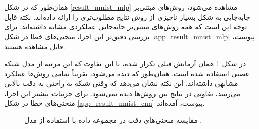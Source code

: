 همان‌طور که در شکل
\ref{result_mnist_mlp} 
مشاهده می‌شود، روش‌های مبتنی‌بر جابه‌جایی به شکل بسیار ناچیزی از روش
نتایج مطلوب‌تری را ارائه داده‌اند. نکته قابل توجه این است که همه روش‌های مبتنی‌بر جابه‌جایی عملکردی مشابه داشته‌اند. برای بررسی دقیق‌تر این اجرا، منحنی‌های خطا در شکل
\ref{app_result_mnist_mlp}
پیوست، قابل مشاهده هستند.


در شکل
\ref{result_mnist_cnn}
همان آزمایش قبلی تکرار شده، با این تفاوت که این مرتبه از مدل شبکه عصبی
استفاده شده است. همان‌طور که دیده می‌شود، تقریباً تمامی روش‌ها عملکرد مشابهی داشته‌اند. این نکته نشان می‌دهد که وقتی شبکه به راحتی به دقت بالایی می‌رسد، تفاوتی در نتایج بین روش‌ها دیده نمی‌شود. برای جزئیات بیشتر این اجرا، منحنی‌های خطا در شکل
\ref{app_result_mnist_cnn}
پیوست، آمده‌اند.


\begin{figure}[h]
	\centering
	\hspace{0.8mm}
	\caption{
		مقایسه منحنی‌های دقت در مجموعه داده
		با استفاده از مدل
		.
	}
	\label{result_mnist_cnn}
\end{figure}





